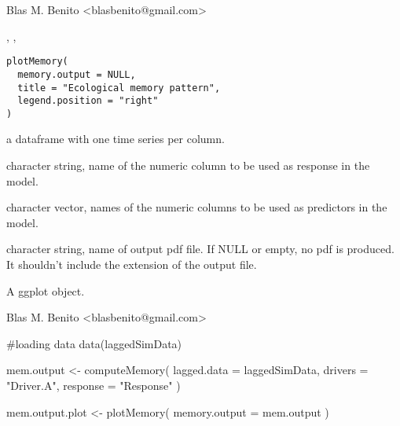 \documentclass[letterpaper]{book}
\begin{document}
%
\begin{Author}\relax
Blas M. Benito  <blasbenito@gmail.com>
\end{Author}
%
\begin{SeeAlso}\relax
{}, , 
\end{SeeAlso}
%
\begin{Usage}
\begin{verbatim}
plotMemory(
  memory.output = NULL,
  title = "Ecological memory pattern",
  legend.position = "right"
)
\end{verbatim}
\end{Usage}
%
\begin{Arguments}
\begin{ldescription}
\item[\code{memory.output}] a dataframe with one time series per column.

\item[\code{title}] character string, name of the numeric column to be used as response in the model.

\item[\code{legend.position}] character vector, names of the numeric columns to be used as predictors in the model.

\item[\code{filename}] character string, name of output pdf file. If NULL or empty, no pdf is produced. It shouldn't include the extension of the output file.
\end{ldescription}
\end{Arguments}
%
\begin{Value}
A ggplot object.
\end{Value}
%
\begin{Author}\relax
Blas M. Benito  <blasbenito@gmail.com>
\end{Author}
%
\begin{SeeAlso}\relax
{}
\end{SeeAlso}
%
\begin{Examples}
\begin{ExampleCode}
#loading data
data(laggedSimData)

mem.output <- computeMemory(
 lagged.data = laggedSimData,
 drivers = "Driver.A",
 response = "Response"
)

mem.output.plot <- plotMemory(
 memory.output = mem.output
 )

\end{ExampleCode}
\end{Examples}
\end{document}
